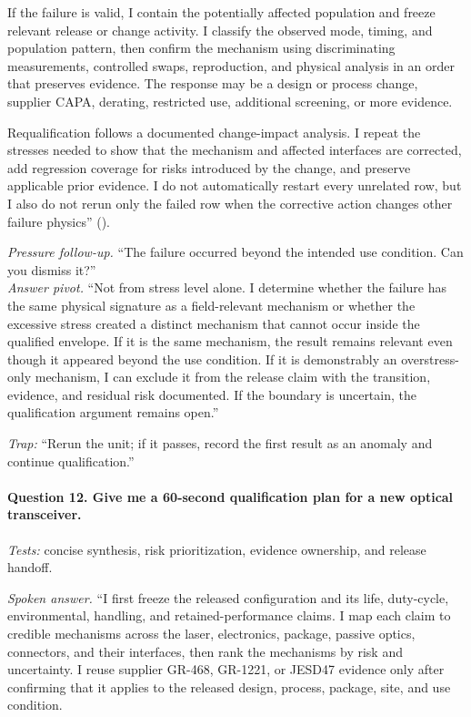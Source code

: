 If the failure is valid, I contain the potentially affected population and
freeze relevant release or change activity. I classify the observed mode,
timing, and population pattern, then confirm the mechanism using discriminating
measurements, controlled swaps, reproduction, and physical analysis in an
order that preserves evidence. The response may be a design or process change,
supplier CAPA, derating, restricted use, additional screening, or more
evidence.

Requalification follows a documented change-impact analysis. I repeat the
stresses needed to show that the mechanism and affected interfaces are
corrected, add regression coverage for risks introduced by the change, and
preserve applicable prior evidence. I do not automatically restart every
unrelated row, but I also do not rerun only the failed row when the corrective
action changes other failure physics''
().

\textit{Pressure follow-up.} ``The failure occurred beyond the intended use
condition. Can you dismiss it?''\\
\textit{Answer pivot.} ``Not from stress level alone. I determine whether the
failure has the same physical signature as a field-relevant mechanism or
whether the excessive stress created a distinct mechanism that cannot occur
inside the qualified envelope. If it is the same mechanism, the result remains
relevant even though it appeared beyond the use condition. If it is demonstrably
an overstress-only mechanism, I can exclude it from the release claim with the
transition, evidence, and residual risk documented. If the boundary is
uncertain, the qualification argument remains open.''

\textit{Trap:} ``Rerun the unit; if it passes, record the first result as an
anomaly and continue qualification.''

\paragraph{Question 12. Give me a 60-second qualification plan for a new
optical transceiver.}
\textit{Tests:} concise synthesis, risk prioritization, evidence ownership, and
release handoff.

\textit{Spoken answer.}
``I first freeze the released configuration and its life, duty-cycle,
environmental, handling, and retained-performance claims. I map each claim to
credible mechanisms across the laser, electronics, package, passive optics,
connectors, and their interfaces, then rank the mechanisms by risk and
uncertainty. I reuse supplier GR-468, GR-1221, or JESD47 evidence only after
confirming that it applies to the released design, process, package, site, and
use condition.

